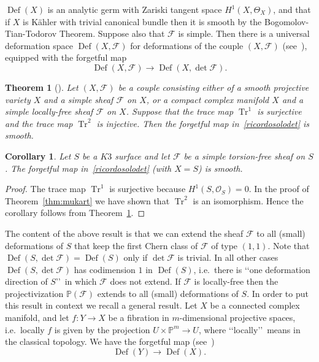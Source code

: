\documentclass[11pt]{amsart}
\newcommand{\PP}{{\mathbb P}}
\let\mathcal\mathscr
\def\cF{\mathcal{F}}
\def\cO{\mathcal{O}}
\DeclareMathOperator{\Def}{Def}
\DeclareMathOperator{\Tr}{Tr}
\def\lra{\longrightarrow}
\newtheorem{thm}[lmm]{Theorem}
\newtheorem{crl}[lmm]{Corollary}
\theoremstyle{definition}
\theoremstyle{remark}
\begin{document}
$\Def(X)$ is an analytic germ with Zariski tangent space $H^1(X,\Theta_X)$, and that if $X$ is K\"ahler with trivial canonical bundle then it is smooth by the Bogomolov-Tian-Todorov Theorem.  Suppose also that $\cF$ is simple. Then there is a universal deformation space $\Def(X,\cF)$ for deformations of the couple $(X,\cF)$ (see~\cite{iacono-manetti:defcoppie}), equipped with the forgetful map
%
\begin{equation}\label{ricordosolodet}
%
\Def(X,\cF) \lra \Def(X,\det\cF).
%
\end{equation}
%
%
\begin{thm}[\cite{huang:modcoppie,iacono-manetti:defcoppie}]\label{thm:defcoppia}
%
Let $(X,\cF)$ be a couple consisting  either of a smooth projective variety $X$  and 
  a simple  sheaf $\cF$  on $X$, or a compact complex manifold $X$ and a simple locally-free sheaf $\cF$  on $X$.  Suppose that the trace map $\Tr^1$ is surjective and the trace map $\Tr^2$ is injective. Then the forgetful map in~\eqref{ricordosolodet}  is smooth. 
%
\end{thm}
%
%
\begin{crl}\label{crl:defcoppia}
%
Let $S$ be a $K3$ surface and let $\cF$ be a simple torsion-free sheaf on $S$. The forgetful map in~\eqref{ricordosolodet} (with $X=S$) is smooth. 
%
\end{crl}
%
%
\begin{proof}
%
The trace map $\Tr^1$ is surjective because $H^1(S,\cO_S)=0$. In the proof of Theorem~\ref{thm:mukart} we have  shown that $\Tr^2$ is an isomorphism. Hence the corollary follows from Theorem~\ref{thm:defcoppia}.
%
\end{proof}
%
The content of the above result is that we can extend the sheaf $\cF$ to all (small) deformations of $S$ that keep the first Chern class of $\cF$ of type 
$(1,1)$. Note that  $\Def(S,\det\cF)=\Def(S)$ only if  $\det\cF$ is trivial. In all other cases 
$\Def(S,\det\cF)$ has codimension $1$ in $\Def(S)$, i.e.~there is \lq\lq one deformation direction of $S$\rq\rq\ in which $\cF$ does not extend. If $\cF$ is locally-free  then the  projectivization  $\PP(\cF)$ extends to all (small) deformations of $S$. In order to put  this result in context we recall a general result. Let $X$ be a connected complex manifold, and let $f\colon Y\to X$ be a fibration in $m$-dimensional projective spaces, i.e.~locally $f$ is given by the projection $U\times\PP^m\to U$, where \lq\lq locally\rq\rq\ means in the classical topology. We have the forgetful 
map (see~\cite[Expl.~8.2.14]{manetti-libro})
%
\begin{equation}\label{fibratobase}
%
\Def(Y) \lra \Def(X).
%
\end{equation}
\end{document}
